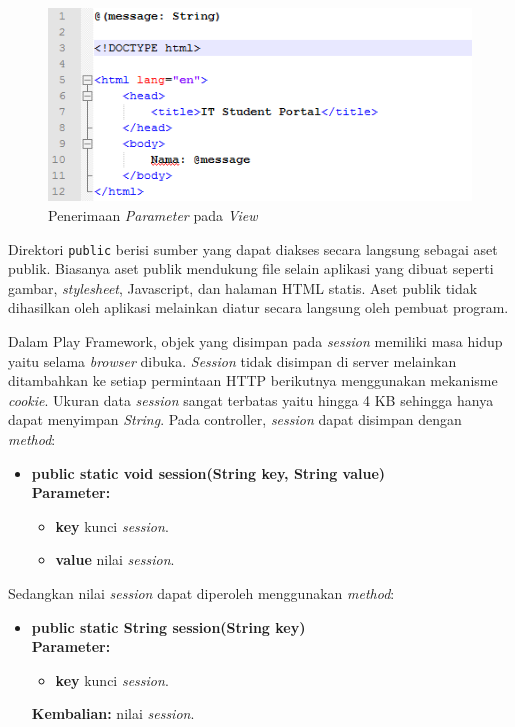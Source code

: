 \documentclass[a4paper,twoside]{article}
\begin{document}
\begin{enumerate}
\begin{enumerate}
\begin{figure}[H]
	\centering
	\includegraphics[scale=0.75]{Gambar/example-view}
	\caption{Penerimaan \textit{Parameter} pada \textit{View}} 
	\label{fig:2_exam_view}
\end{figure}

Direktori \texttt{public} berisi sumber yang dapat diakses secara langsung sebagai aset publik. Biasanya aset publik mendukung file selain aplikasi yang dibuat seperti gambar, \textit{stylesheet}, Javascript, dan halaman HTML statis. Aset publik tidak dihasilkan oleh aplikasi melainkan diatur secara langsung oleh pembuat program.

Dalam Play Framework, objek yang disimpan pada \textit{session} memiliki masa hidup yaitu selama \textit{browser} dibuka. \textit{Session} tidak disimpan di server melainkan ditambahkan ke setiap permintaan HTTP berikutnya menggunakan mekanisme \textit{cookie}. Ukuran data \textit{session} sangat terbatas yaitu hingga 4 KB sehingga hanya dapat menyimpan \textit{String}. Pada controller, \textit{session} dapat disimpan dengan \textit{method}:
	\begin{itemize}
			\item \textbf{public static void session(String key, String value)} \\
				\textbf{Parameter:}
				\begin{itemize}
					\item \textbf{key} kunci \textit{session}.
					\item \textbf{value} nilai \textit{session}.
				\end{itemize}
	\end{itemize}
 Sedangkan nilai \textit{session} dapat diperoleh menggunakan \textit{method}: 
\begin{itemize}
			\item \textbf{public static String session(String key)} \\
				\textbf{Parameter:}
				\begin{itemize}
					\item \textbf{key} kunci \textit{session}.
				\end{itemize}
				\textbf{Kembalian:} nilai \textit{session}.
	\end{itemize}



\end{enumerate}
\end{enumerate}
\end{document}
